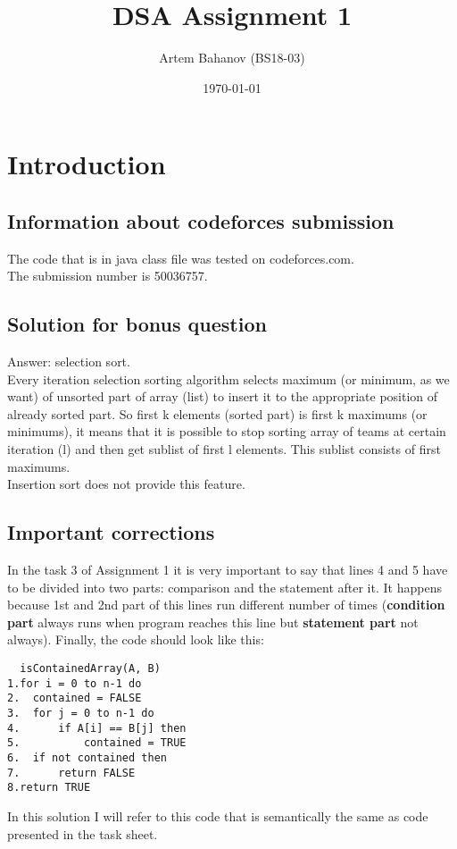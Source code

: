 \documentclass[12pt]{article}
\title{DSA Assignment 1}
\author{Artem Bahanov (BS18-03)}
\date{\today}
\begin{document}
\maketitle
\newpage
\section{Introduction}
\subsection{Information about codeforces submission}
The code that is in java class file was tested on codeforces.com.\\
The submission number is 50036757.
\subsection{Solution for bonus question}
Answer: selection sort.\\
Every iteration selection sorting algorithm selects maximum (or minimum, as we want) of unsorted part of array (list) to insert it to the appropriate position of already sorted part. So first k elements (sorted part) is first k maximums (or minimums), it means that it is possible to stop sorting array of teams at certain iteration (l) and then get sublist of first l elements. This sublist consists of first maximums.\\
Insertion sort does not provide this feature.
\subsection{Important corrections}
In the task 3 of Assignment 1 it is very important to say that lines 4 and 5 have to be divided into two parts: comparison and the statement after it. It happens because 1st and 2nd part of this lines run different number of times (\textbf{condition part} always runs when program reaches this line but \textbf{statement part} not always). Finally, the code should look like this:

\begin{lstlisting}
  isContainedArray(A, B)
1.for i = 0 to n-1 do
2.	contained = FALSE
3.  for j = 0 to n-1 do
4.  	if A[i] == B[j] then
5.   		contained = TRUE
6.	if not contained then
7.		return FALSE
8.return TRUE

\end{lstlisting}

In this solution I will refer to this code that is semantically the same as code presented in the task sheet.
\end{document}
